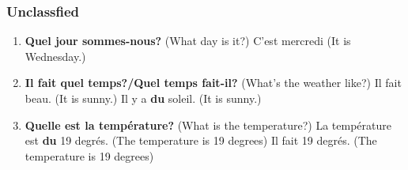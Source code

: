 \documentclass[10pt,a4paper,twoside]{article} %
\begin{document}
\subsubsection*{Unclassfied}
\begin{enumerate}
    \item \textbf{Quel jour sommes-nous?} (What day is it?) \newline
    C'est mercredi (It is Wednesday.)
    \item \textbf{Il fait quel temps?/Quel temps fait-il?} (What's the weather like?) \newline
    Il fait beau. (It is sunny.) \newline
    Il y a \textbf{du} soleil. (It is sunny.)
    \item \textbf{Quelle est la température?} (What is the temperature?) \newline
    La température est \textbf{du} 19 degrés. (The temperature is 19 degrees) \newline
    Il fait 19 degrés. (The temperature is 19 degrees)
\end{enumerate}
\end{document}
